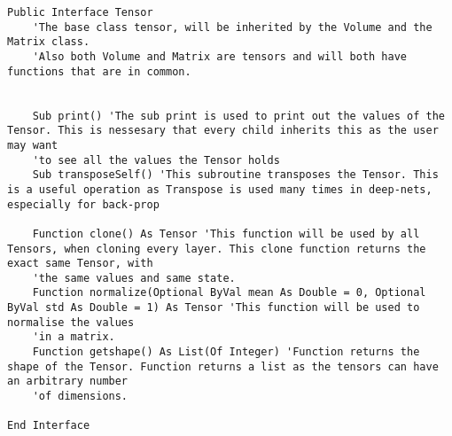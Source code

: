 \begin{verbatim}
Public Interface Tensor
    'The base class tensor, will be inherited by the Volume and the Matrix class.
    'Also both Volume and Matrix are tensors and will both have functions that are in common.


    Sub print() 'The sub print is used to print out the values of the Tensor. This is nessesary that every child inherits this as the user may want
    'to see all the values the Tensor holds
    Sub transposeSelf() 'This subroutine transposes the Tensor. This is a useful operation as Transpose is used many times in deep-nets, especially for back-prop

    Function clone() As Tensor 'This function will be used by all Tensors, when cloning every layer. This clone function returns the exact same Tensor, with
    'the same values and same state.
    Function normalize(Optional ByVal mean As Double = 0, Optional ByVal std As Double = 1) As Tensor 'This function will be used to normalise the values
    'in a matrix.
    Function getshape() As List(Of Integer) 'Function returns the shape of the Tensor. Function returns a list as the tensors can have an arbitrary number
    'of dimensions.

End Interface
\end{verbatim}